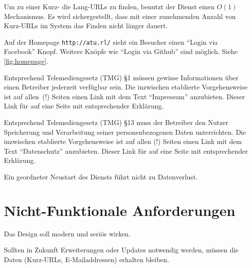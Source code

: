 \documentclass[parskip=full,11pt,twoside]{scrartcl}
\begin{document}
Um zu einer Kurz- die Lang-URLs zu finden,
benutzt der Dienst einen $O(1)$ Mechanismus.
Es wird sichergestellt,
dass mit einer zunehmenden Anzahl von Kurz-URLs im System
das Finden nicht länger dauert.


Auf der Homepage \texttt{http://atu.rl/} sieht ein Besucher
einen \enquote{Login via Facebook} Knopf.
Weitere Knöpfe wie \enquote{Login via Github} sind möglich.
Siehe \cref{fig:homepage}.


Entsprechend Telemediengesetz (TMG) §1
müssen gewisse Informationen über einen Betreiber jederzeit verfügbar sein.
Die inzwischen etablierte Vorgehensweise ist auf allen~(!) Seiten
einen Link mit dem Text \enquote{Impressum} anzubieten.
Dieser Link für auf eine Seite mit entsprechender Erklärung.


Entsprechend Telemediengesetz (TMG) §13
muss der Betreiber den Nutzer Speicherung und Verarbeitung seiner personenbezogenen Daten unterrichten.
Die inzwischen etablierte Vorgehensweise ist auf allen (!) Seiten
einen Link mit dem Text \enquote{Datenschutz} anzubieten.
Dieser Link für auf eine Seite mit entsprechender Erklärung.


Ein geordneter Neustart des Diensts führt nicht zu Datenverlust.

\section{Nicht-Funktionale Anforderungen}


Das Design soll modern und seriös wirken.


Sollten in Zukunft Erweiterungen oder Updates notwendig werden,
müssen die Daten (Kurz-URLs, E-Mailaddressen) erhalten bleiben.

\end{document}
